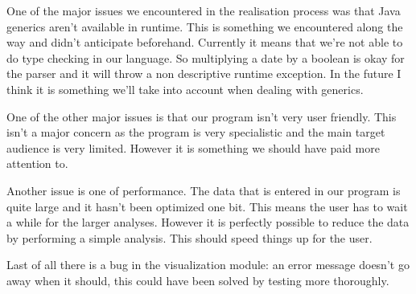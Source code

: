 One of the major issues we encountered in the realisation process was that Java generics aren't available in runtime. This is something we encountered along the way and didn't anticipate beforehand. Currently it means that we're not able to do type checking in our language. So multiplying a date by a boolean is okay for the parser and it will throw a non descriptive runtime exception. In the future I think it is something we'll take into account when dealing with generics.

One of the other major issues is that our program isn't very user friendly. This isn't a major concern as the program is very specialistic and the main target audience is very limited. However it is something we should have paid more attention to. 

Another issue is one of performance. The data that is entered in our program is quite large and it  hasn't been optimized one bit. This means the user has to wait a while for the larger analyses. However it is perfectly possible to reduce the data by performing a simple analysis. This should speed things up for the user.

Last of all there is a bug in the visualization module: an error message doesn't go away when it should, this could have been solved by testing more thoroughly.